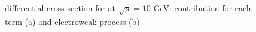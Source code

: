 \documentclass[12pt,letterpaper]{article}
\begin{document}
\begin{figure}[!ht]
\centering
{}
\caption{differential cross section for at $\sqrt{s} = 10$ GeV: contribution for each term (a) and electroweak process (b)}
\label{10gev_contrib}
\end{figure}
\end{document}
